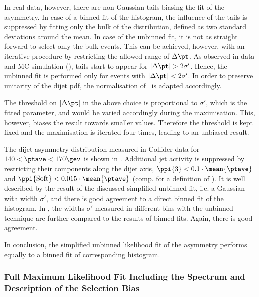 In real data, however, there are non-Gaussian tails biasing the fit of the asymmetry.
In case of a binned fit of the histogram, the influence of the tails is suppressed by
fitting only the bulk of the distribution, defined as two standard deviations around the mean.
In case of the unbinned fit, it is not as straight
forward to select only the bulk events.
This can be achieved, however, with an iterative procedure by restricting
the allowed range of $\Delta\pt$.
As observed in data and MC simulation (), tails start to appear for \mbox{$|\Delta\pt| > 2\sigma'$}.
Hence, the unbinned fit is performed only for events with \mbox{$|\Delta\pt| < 2\sigma'$}.
In order to preserve unitarity of the dijet pdf, the normalisation
of~ is adapted accordingly.

The threshold on $|\Delta\pt|$ in the above choice is proportional to $\sigma'$, which is the fitted parameter, and would be varied accordingly during the maximisation.
This, however, biases the result towards smaller  values.
Therefore the threshold is kept fixed and the maximisation is iterated
four times, leading to an unbiased result.

The dijet asymmetry distribution measured in Collider data for \mbox{$140 <
  \ptave < 170\gev$} is shown in
.
Additional jet activity is suppressed by restricting their \pt components
along the dijet axis, \mbox{$\ppi{3} < 0.1\cdot\mean{\ptave}$} and
\mbox{$\ppi{\text{Soft}} < 0.015\cdot\mean{\ptave}$} (comp.  for
a definition of \pp).
It is well described by the result of the discussed simplified unbinned fit, i.e. a Gaussian with width $\sigma'$, and there is good agreement to a direct binned fit of the histogram.
In , the widths $\sigma'$ measured in different \ptave bins with the unbinned technique are further compared to the results of binned fits.
Again, there is good agreement.

In conclusion, the simplified unbinned likelihood fit of the asymmetry performs equally to a binned fit of corresponding histogram.



\subsubsection{Full Maximum Likelihood Fit Including the Spectrum and Description of the Selection Bias}\label{sec:ResFit:DataDriven:FullFit}


